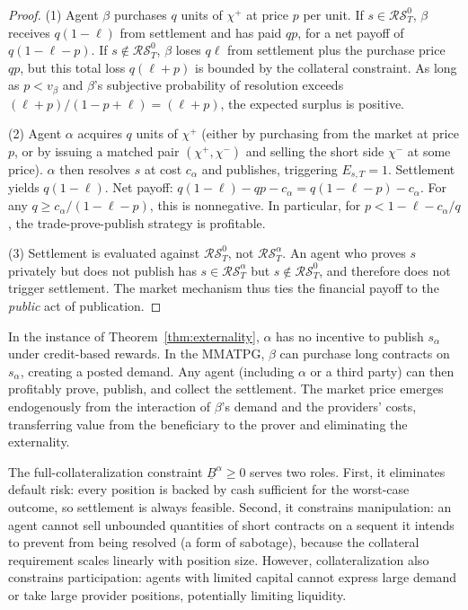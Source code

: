 \begin{proof}
(1) Agent $\beta$ purchases $q$ units of $\chi^+$ at price $p$ per unit. If $s\in\mathcal{RS}^0_T$, $\beta$ receives $q(1-\ell)$ from settlement and has paid $qp$, for a net payoff of $q(1-\ell-p)$. If $s\notin\mathcal{RS}^0_T$, $\beta$ loses $q\ell$ from settlement plus the purchase price $qp$, but this total loss $q(\ell + p)$ is bounded by the collateral constraint. As long as $p < v_\beta$ and $\beta$'s subjective probability of resolution exceeds $(\ell+p)/(1-p+\ell) = (\ell+p)$, the expected surplus is positive.

(2) Agent $\alpha$ acquires $q$ units of $\chi^+$ (either by purchasing from the market at price $p$, or by issuing a matched pair $(\chi^+,\chi^-)$ and selling the short side $\chi^-$ at some price). $\alpha$ then resolves $s$ at cost $c_\alpha$ and publishes, triggering $E_{s,T}=1$. Settlement yields $q(1-\ell)$. Net payoff: $q(1-\ell) - qp - c_\alpha = q(1-\ell-p) - c_\alpha$. For any $q \ge c_\alpha / (1-\ell-p)$, this is nonnegative. In particular, for $p < 1-\ell-c_\alpha/q$, the trade-prove-publish strategy is profitable.

(3) Settlement is evaluated against $\mathcal{RS}^0_T$, not $\mathcal{RS}^\alpha_T$. An agent who proves $s$ privately but does not publish has $s\in\mathcal{RS}^\alpha_T$ but $s\notin\mathcal{RS}^0_T$, and therefore does not trigger settlement. The market mechanism thus ties the financial payoff to the \emph{public} act of publication.
\end{proof}

\begin{remark}
In the instance of Theorem~\ref{thm:externality}, $\alpha$ has no incentive to publish $s_\alpha$ under credit-based rewards. In the MMATPG, $\beta$ can purchase long contracts on $s_\alpha$, creating a posted demand. Any agent (including $\alpha$ or a third party) can then profitably prove, publish, and collect the settlement. The market price emerges endogenously from the interaction of $\beta$'s demand and the providers' costs, transferring value from the beneficiary to the prover and eliminating the externality.
\end{remark}

\begin{remark}\label{rem:collateral}
The full-collateralization constraint $\underline{B}^\alpha \ge 0$ serves two roles. First, it eliminates default risk: every position is backed by cash sufficient for the worst-case outcome, so settlement is always feasible. Second, it constrains manipulation: an agent cannot sell unbounded quantities of short contracts on a sequent it intends to prevent from being resolved (a form of sabotage), because the collateral requirement scales linearly with position size. However, collateralization also constrains participation: agents with limited capital cannot express large demand or take large provider positions, potentially limiting liquidity.
\end{remark}


